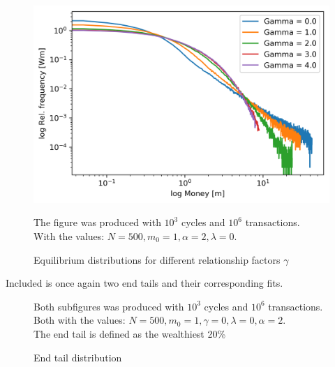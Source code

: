 \documentclass[a4paper,11pt]{article}
\begin{document}
\begin{figure}[H]
	\includegraphics[scale=1]{figures/relationship_mem_1000c_1000000t_nosave_a2.png} 
	\caption{Equilibrium distributions for different relationship factors $\gamma$}
{\small The figure was produced with $10^3$ cycles and $10^6$ transactions. \\With the values: $N = 500, m_0 = 1, \alpha = 2, \lambda = 0$. }
\end{figure}
Included is once again two end tails and their corresponding fits.
\begin{figure}[H]
  \hfill
  \caption{End tail distribution}
{\small Both subfigures was produced with $10^3$ cycles and $10^6$ transactions. \\Both with the values: $N = 500, m_0 = 1, \gamma = 0, \lambda = 0, \alpha = 2$. \\The end tail is defined as the wealthiest 20\% }
\end{figure}
\end{document}
